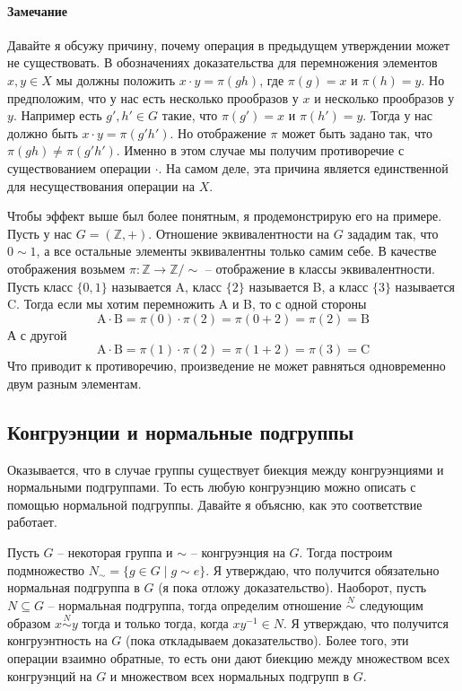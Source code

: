 \paragraph{Замечание}

Давайте я обсужу причину, почему операция в предыдущем утверждении может не существовать.
В обозначениях доказательства для перемножения элементов $x,y\in X$ мы должны положить $x\cdot y = \pi(gh)$, где $\pi(g) = x$ и $\pi(h) = y$.
Но предположим, что у нас есть несколько прообразов у $x$ и несколько прообразов у $y$.
Например есть $g',h'\in G$ такие, что $\pi(g') = x$ и $\pi(h') = y$.
Тогда у нас должно быть $x\cdot y = \pi(g'h')$.
Но отображение $\pi$ может быть задано так, что $\pi(gh) \neq \pi(g'h')$.
Именно в этом случае мы получим противоречие с существованием операции $\cdot$.
На самом деле, эта причина является единственной для несуществования операции на $X$.

Чтобы эффект выше был более понятным, я продемонстрирую его на примере.
Пусть у нас $G = (\mathbb Z, +)$.
Отношение эквивалентности на $G$ зададим так, что $0 \sim 1$, а все остальные элементы эквивалентны только самим себе.
В качестве отображения возьмем $\pi \colon \mathbb Z\to \mathbb Z/{\sim}$ -- отображение в классы эквивалентности.
Пусть класс $\{0, 1\}$ называется A, класс $\{2\}$ называется B, а класс $\{3\}$ называется C.
Тогда если мы хотим перемножить A и B, то с одной стороны
\[
\text{A}\cdot \text{B} = \pi(0) \cdot \pi(2) = \pi(0+2) = \pi(2) = \text{B}
\]
А с другой
\[
\text{A}\cdot \text{B} = \pi(1) \cdot \pi(2) = \pi(1+2) = \pi(3) = \text{C}
\]
Что приводит к противоречию, произведение не может равняться одновременно двум разным элементам.


\subsection{Конгруэнции и нормальные подгруппы}
\label{section::CongrNormalSub}

Оказывается, что в случае группы существует биекция между конгруэнциями и нормальными подгруппами.
То есть любую конгруэнцию можно описать с помощью нормальной подгруппы.
Давайте я объясню, как это соответствие работает.

Пусть $G$ -- некоторая группа и $\sim$ -- конгруэнция на $G$.
Тогда построим подмножество $N_\sim = \{g\in G \mid g \sim e\}$.
Я утверждаю, что получится обязательно нормальная подгруппа в $G$ (я пока отложу доказательство).
Наоборот, пусть $N\subseteq G$ -- нормальная подгруппа, тогда определим отношение $\stackrel{N}{\sim}$ следующим образом $x \stackrel{N}{\sim}y$ тогда и только тогда, когда $xy^{-1}\in N$.
Я утверждаю, что получится конгруэнтность на $G$ (пока откладываем доказательство).
Более того, эти операции взаимно обратные, то есть они дают биекцию между множеством всех конгруэнций на $G$ и множеством всех нормальных подгрупп в $G$.

